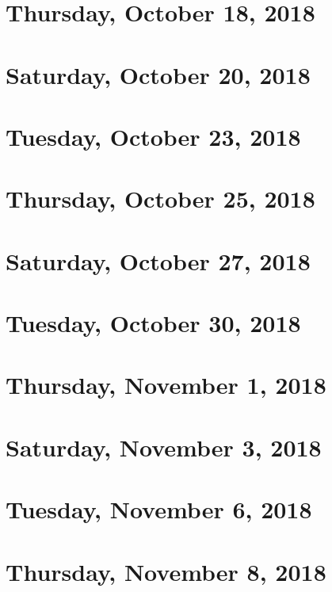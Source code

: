 \documentclass[reqno]{amsart}
\begin{document}
\section{Thursday, October 18, 2018}
    

\section{Saturday, October 20, 2018}
    
    
\section{Tuesday, October 23, 2018}
    

\section{Thursday, October 25, 2018}
    
    
\section{Saturday, October 27, 2018}
    
    
\section{Tuesday, October 30, 2018}
    
    
\section{Thursday, November 1, 2018}
    

\section{Saturday, November 3, 2018}
    

\section{Tuesday, November 6, 2018}
    

\section{Thursday, November 8, 2018}
    
    
\end{document}
